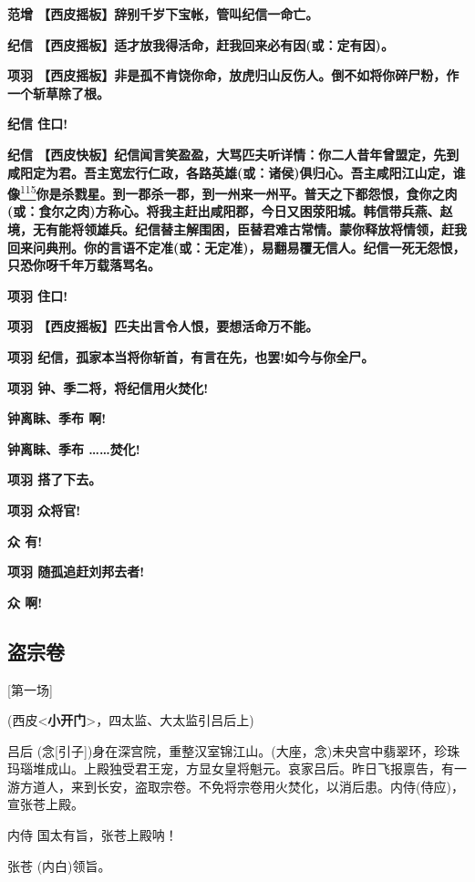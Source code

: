 \textbf{范增 【西皮摇板】辞别千岁下宝帐，管叫纪信一命亡。}

\textbf{纪信 【西皮摇板】适才放我得活命，赶我回来必有因(或：定有因)。}

\textbf{项羽
【西皮摇板】非是孤不肯饶你命，放虎归山反伤人。倒不如将你碎尸粉，作一个斩草除了根。}

\textbf{纪信 住口!}

\textbf{纪信
【西皮快板】纪信闻言笑盈盈，大骂匹夫听详情：你二人昔年曾盟定，先到咸阳定为君。吾主宽宏行仁政，各路英雄(或：诸侯)俱归心。吾主咸阳江山定，谁像}\protect\hyperlink{fn115}{\textsuperscript{115}}\textbf{你是杀戮星。到一郡杀一郡，到一州来一州平。普天之下都怨恨，食你之肉(或：食尔之肉)方称心。将我主赶出咸阳郡，今日又困荥阳城。韩信带兵燕、赵境，无有能将领雄兵。纪信替主解围困，臣替君难古常情。蒙你释放将情领，赶我回来问典刑。你的言语不定准(或：无定准)，易翻易覆无信人。纪信一死无怨恨，只恐你呀千年万载落骂名。}

\textbf{项羽 住口!}

\textbf{项羽 【西皮摇板】匹夫出言令人恨，要想活命万不能。}

\textbf{项羽 纪信，孤家本当将你斩首，有言在先，也罢!如今与你全尸。}

\textbf{项羽 钟、季二将，将纪信用火焚化!}

\textbf{钟离眛、季布 啊!}

\textbf{钟离眛、季布 \ldots{}\ldots{}焚化!}

\textbf{项羽 搭了下去。}

\textbf{项羽 众将官!}

\textbf{众 有!}

\textbf{项羽 随孤追赶刘邦去者!}

\textbf{众 啊!}

\hypertarget{ux76d7ux5b97ux5377}{%
\subsection{盗宗卷}\label{ux76d7ux5b97ux5377}}

{[}第一场{]}

(西皮\textless{}\textbf{小开门}\textgreater{}，四太监、大太监引吕后上)

吕后
(念{[}引子{]})身在深宫院，重整汉室锦江山。(大座，念)未央宫中翡翠环，珍珠玛瑙堆成山。上殿独受君王宠，方显女皇将魁元。哀家吕后。昨日飞报禀告，有一游方道人，来到长安，盗取宗卷。不免将宗卷用火焚化，以消后患。内侍(侍应)，宣张苍上殿。

内侍 国太有旨，张苍上殿呐！

张苍 (内白)领旨。

